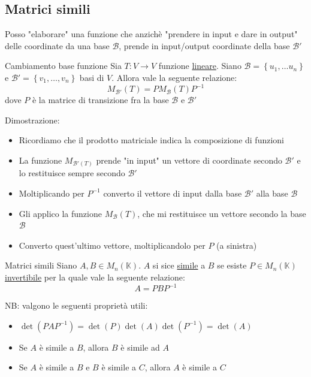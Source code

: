 \subsection{Matrici simili}
Posso "elaborare" una funzione che anzichè "prendere in input e dare in output" delle coordinate da una base $ \mathcal{B} $, prende in input/output coordinate della base $ \mathcal{B}' $
\begin{teorema}{Cambiamento base funzione}
	Sia $  T : V \to V $ funzione \underline{lineare}. Siano $ \mathcal{B} = \left\{ u_1,\ldots u_n \right\} $ e $ \mathcal{B}' = \left\{ v_1,\ldots,v_n \right\}  $ basi di $ V $. Allora vale la seguente relazione:
	\[
		M_{\mathcal{B}'} \left( T \right) = P M_{\mathcal{B}} \left( T \right) P^{-1}
	\]
	dove $ P $ è la matrice di transizione fra la base $ \mathcal{B} $ e $ \mathcal{B}' $
\end{teorema}
Dimostrazione:
\begin{itemize}
	\item Ricordiamo che il prodotto matriciale indica la composizione di funzioni
	\item La funzione $ M_{\mathcal{B}'\left( T \right) } $ prende "in input" un vettore di coordinate secondo $ \mathcal{B}' $ e lo restituisce sempre secondo $ \mathcal{B}' $
	\item Moltiplicando per $ P^{-1} $ converto il vettore di input dalla base $ \mathcal{B}' $ alla base $ \mathcal{B} $
	\item Gli applico la funzione $ M_{\mathcal{B}}\left( T \right)  $, che mi restituisce un vettore secondo la base $ \mathcal{B} $
	\item Converto quest'ultimo vettore, moltiplicandolo per $ P $ (a sinistra)
\end{itemize}
\begin{teorema}{Matrici simili}
	Siano $ A,B \in  M_n\left( \mathbb{K} \right)  $. $ A  $ si sice \underline{simile} a $ B $ se esiste $ P \in  M_n \left( \mathbb{K} \right)  $ \underline{invertibile} per la quale vale la seguente relazione:
	\[
		A = PBP^{-1}
	\]
\end{teorema}
NB: valgono le seguenti proprietà utili:
\begin{itemize}
	\item $ \det \left( PAP^{-1} \right) = \det \left( P \right) \det \left( A \right) \det \left( P^{-1} \right) = \det  \left( A \right)  $
	\item Se $ A $ è simile a $ B $, allora $ B $ è simile ad $ A $
	\item Se $ A $ è simile a $ B $ e $ B $ è simile a $ C $, allora $ A $ è simile a $ C $
\end{itemize}

